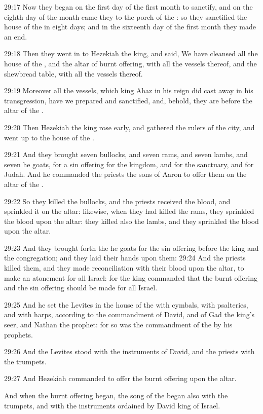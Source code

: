 29:17 Now they began on the first day of the first month to sanctify, and on the eighth day of the month came they to the porch of the \LORD: so they sanctified the house of the \LORD in eight days; and in the sixteenth day of the first month they made an end.

29:18 Then they went in to Hezekiah the king, and said, We have cleansed all the house of the \LORD, and the altar of burnt offering, with all the vessels thereof, and the shewbread table, with all the vessels thereof.

29:19 Moreover all the vessels, which king Ahaz in his reign did cast away in his transgression, have we prepared and sanctified, and, behold, they are before the altar of the \LORD.

29:20 Then Hezekiah the king rose early, and gathered the rulers of the city, and went up to the house of the \LORD.

29:21 And they brought seven bullocks, and seven rams, and seven lambs, and seven he goats, for a sin offering for the kingdom, and for the sanctuary, and for Judah. And he commanded the priests the sons of Aaron to offer them on the altar of the \LORD.

29:22 So they killed the bullocks, and the priests received the blood, and sprinkled it on the altar: likewise, when they had killed the rams, they sprinkled the blood upon the altar: they killed also the lambs, and they sprinkled the blood upon the altar.

29:23 And they brought forth the he goats for the sin offering before the king and the congregation; and they laid their hands upon them: 29:24 And the priests killed them, and they made reconciliation with their blood upon the altar, to make an atonement for all Israel: for the king commanded that the burnt offering and the sin offering should be made for all Israel.

29:25 And he set the Levites in the house of the \LORD with cymbals, with psalteries, and with harps, according to the commandment of David, and of Gad the king's seer, and Nathan the prophet: for so was the commandment of the \LORD by his prophets.

29:26 And the Levites stood with the instruments of David, and the priests with the trumpets.

29:27 And Hezekiah commanded to offer the burnt offering upon the altar.

And when the burnt offering began, the song of the \LORD began also with the trumpets, and with the instruments ordained by David king of Israel.

